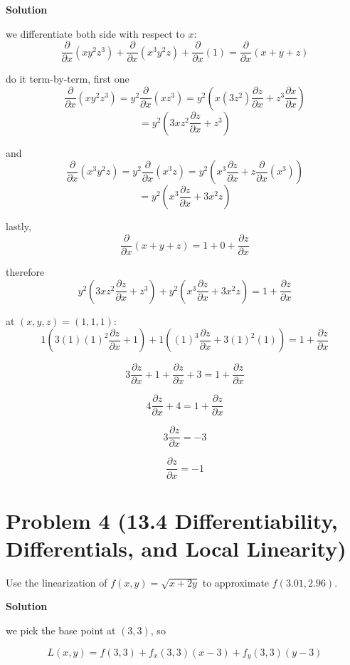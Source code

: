 \documentclass{article}
\newcommand{\solution}{\textbf{\large Solution}}
\theoremstyle{remark}
\begin{document}
\medskip
\solution

we differentiate both side with respect to $x$:
\[
    \frac{\partial}{\partial x}(xy^2z^3) + \frac{\partial}{\partial x}(x^3y^2z) + \frac{\partial}{\partial x}(1) = \frac{\partial}{\partial x}(x+y+z)
\]

do it term-by-term, first one
\[
    \frac{\partial}{\partial x}(xy^2z^3) = y^2 \frac{\partial}{\partial x}(xz^3)
    = y^2\left(x(3z^2)\frac{\partial z}{\partial x} + z^3 \frac{\partial x}{\partial x}\right)
\]
\[
    = y^2\left(3xz^2\frac{\partial z}{\partial x} + z^3\right)
\]

and
\[
    \frac{\partial}{\partial x}(x^3y^2z) = y^2 \frac{\partial}{\partial x}(x^3z)
    = y^2\left(x^3 \frac{\partial z}{\partial x} + z \frac{\partial}{\partial x}(x^3)\right)
\]
\[
    = y^2\left(x^3\frac{\partial z}{\partial x} + 3x^2z\right)
\]

lastly,
\[
    \frac{\partial}{\partial x}(x+y+z) = 1 + 0 + \frac{\partial z}{\partial x}
\]

therefore
\[
    y^2\left(3xz^2\frac{\partial z}{\partial x} + z^3\right)
    +
    y^2\left(x^3\frac{\partial z}{\partial x} + 3x^2z\right)
    = 1 + \frac{\partial z}{\partial x}
\]

at $(x,y,z) = (1,1,1)$:
\[
    1\left(3(1)(1)^2\frac{\partial z}{\partial x} + 1\right)
    +
    1\left((1)^3\frac{\partial z}{\partial x} + 3(1)^2(1)\right)
    = 1 + \frac{\partial z}{\partial x}
\]

\[
    3\frac{\partial z}{\partial x} + 1 + \frac{\partial z}{\partial x} + 3
    = 1 + \frac{\partial z}{\partial x}
\]

\[
    4\frac{\partial z}{\partial x} + 4 = 1 + \frac{\partial z}{\partial x}
\]

\[
    3\frac{\partial z}{\partial x} = -3
\]

\[
    \boxed{\frac{\partial z}{\partial x} = -1}
\]

\vspace{1em}
\hrulefill

\section*{Problem 4 (13.4 Differentiability, Differentials, and Local Linearity)}
Use the linearization of $f(x, y) = \sqrt{x + 2y}$ to approximate $f(3.01, 2.96)$.

\medskip
\solution

we pick the base point at $(3,3)$, so

\[
    L(x,y) = f(3,3) + f_x(3,3)(x-3) + f_y(3,3)(y-3)
\]
\end{document}
